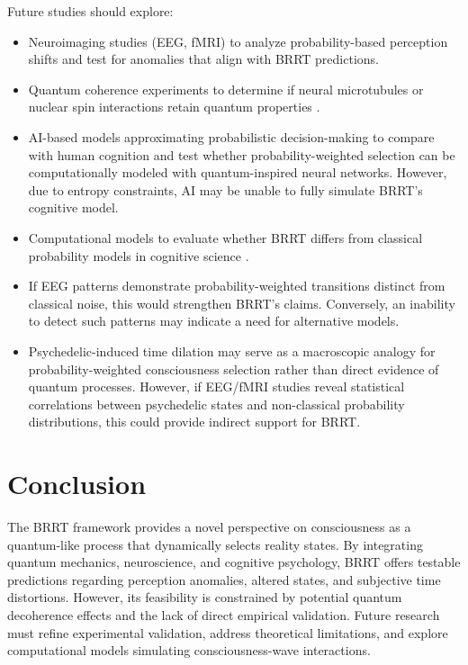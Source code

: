\documentclass{article}
\begin{document}
Future studies should explore:
\begin{itemize}
    \item Neuroimaging studies (EEG, fMRI) to analyze probability-based perception shifts and test for anomalies that align with BRRT predictions.
    \item Quantum coherence experiments to determine if neural microtubules or nuclear spin interactions retain quantum properties \cite{hameroff2014consciousness}.
    \item AI-based models approximating probabilistic decision-making to compare with human cognition and test whether probability-weighted selection can be computationally modeled with quantum-inspired neural networks. However, due to entropy constraints, AI may be unable to fully simulate BRRT’s cognitive model.
    \item Computational models to evaluate whether BRRT differs from classical probability models in cognitive science \cite{tegmark2015consciousness}.
    \item If EEG patterns demonstrate probability-weighted transitions distinct from classical noise, this would strengthen BRRT’s claims. Conversely, an inability to detect such patterns may indicate a need for alternative models.
    \item Psychedelic-induced time dilation may serve as a macroscopic analogy for probability-weighted consciousness selection rather than direct evidence of quantum processes. However, if EEG/fMRI studies reveal statistical correlations between psychedelic states and non-classical probability distributions, this could provide indirect support for BRRT.
\end{itemize}

\section{Conclusion}
The BRRT framework provides a novel perspective on consciousness as a quantum-like process that dynamically selects reality states. By integrating quantum mechanics, neuroscience, and cognitive psychology, BRRT offers testable predictions regarding perception anomalies, altered states, and subjective time distortions. However, its feasibility is constrained by potential quantum decoherence effects and the lack of direct empirical validation. Future research must refine experimental validation, address theoretical limitations, and explore computational models simulating consciousness-wave interactions.



\end{document}
